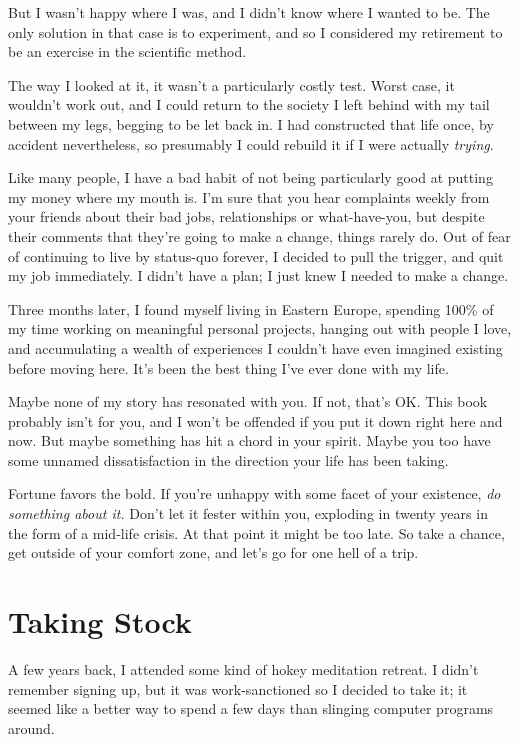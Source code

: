 \documentclass[]{book}
\begin{document}
But I wasn't happy where I was, and I didn't know where I wanted to be. The only
solution in that case is to experiment, and so I considered my retirement to be
an exercise in the scientific method.

The way I looked at it, it wasn't a particularly costly test. Worst case, it
wouldn't work out, and I could return to the society I left behind with my tail
between my legs, begging to be let back in. I had constructed that life once, by
accident nevertheless, so presumably I could rebuild it if I were actually
\textit{trying}.

Like many people, I have a bad habit of not being particularly good at putting
my money where my mouth is.  I'm sure that you hear
complaints weekly from your friends about their bad jobs, relationships or
what-have-you, but despite their comments that they're going to make a change,
things rarely do. Out of fear of continuing to live by status-quo forever, I
decided to pull the trigger, and quit my job immediately. I didn't have a plan;
I just knew I needed to make a change.

Three months later, I found myself living in Eastern Europe, spending 100\% of
my time working on meaningful personal projects, hanging out with people I love,
and accumulating a wealth of experiences I couldn't have even imagined existing
before moving here. It's been the best thing I've ever done with my life.

Maybe none of my story has resonated with you. If not, that's OK. This book
probably isn't for you, and I won't be offended if you put it down right here
and now. But maybe something has hit a chord in your spirit. Maybe you too have
some unnamed dissatisfaction in the direction your life has been taking.

Fortune favors the bold. If you're unhappy with some facet of your existence,
\textit{do something about it.} Don't let it fester within you, exploding in
twenty years in the form of a mid-life crisis. At that point it might be too
late. So take a chance, get outside of your comfort zone, and let's go for one
hell of a trip.


\chapter{Taking Stock}

A few years back, I attended some kind of hokey meditation retreat. I didn't
remember signing up, but it was work-sanctioned so I decided to take it; it
seemed like a better way to spend a few days than slinging computer programs
around.
\end{document}
